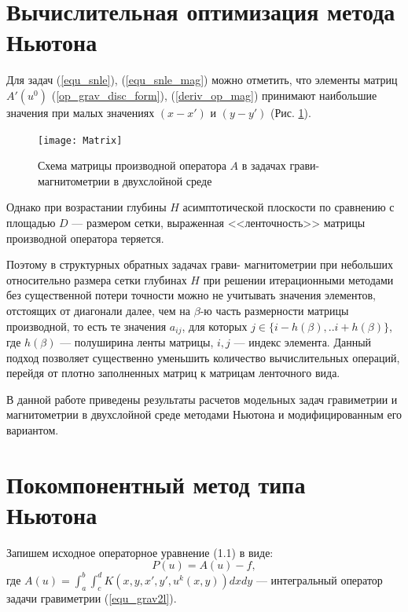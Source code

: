 \section{Вычислительная оптимизация метода Ньютона}

Для задач (\ref{equ_snle}), (\ref{equ_snle_mag}) можно отметить, что элементы матриц $A'(u^0)$ (\ref{op_grav_disc_form}), (\ref{deriv_op_mag}) принимают наибольшие значения при малых значениях $(x-x')$ и $(y-y')$ (Рис. \ref{fig:matrixscheme}).
\begin{figure}
	\centering
	\texttt{[image: Matrix]}
	\caption{Схема матрицы производной оператора $A$ в задачах грави- магнитометрии в двухслойной среде}
	\label{fig:matrixscheme}
\end{figure}
Однако при возрастании глубины $H$ асимптотической плоскости по сравнению с площадью $D$ --- размером сетки, выраженная <<ленточность>> матрицы производной оператора теряется.

Поэтому в структурных обратных задачах грави- магнитометрии при небольших относительно размера сетки глубинах $H$ при решении итерационными методами без существенной потери точности можно не учитывать значения элементов, отстоящих от диагонали далее, чем на  $\beta$-ю часть  размерности матрицы производной, то есть те значения $a_{ij}$, для которых  $j \in \{i-h(\beta),..i+h(\beta)\} $, где $h(\beta)$ --- полуширина ленты матрицы, $i, j$ --- индекс элемента. Данный подход позволяет существенно уменьшить количество вычислительных операций, перейдя от плотно заполненных матриц к матрицам ленточного вида.

В данной работе приведены результаты расчетов модельных задач гравиметрии и магнитометрии в двухслойной среде методами Ньютона и модифицированным его вариантом.

\section{Покомпонентный метод типа Ньютона}

Запишем исходное операторное уравнение (1.1) в виде:
$$P(u)=A(u)-f,$$
где $A(u)=\int_{a}^{b}\int_{c}^{d}K(x,y, x',y',u^k(x,y))dxdy$ --- интегральный оператор задачи гравиметрии (\ref{equ_grav2l}).

